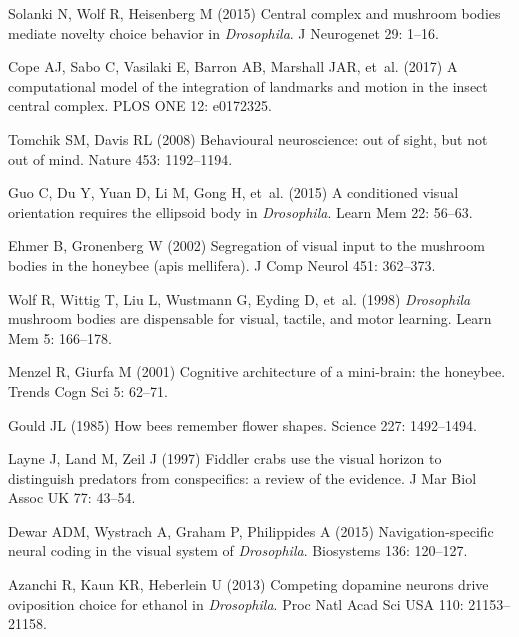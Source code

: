 \begin{thebibliography}{10}
	Solanki N, Wolf R, Heisenberg M (2015) Central complex and mushroom bodies
	mediate novelty choice behavior in \emph{Drosophila}.
	\newblock J Neurogenet 29: 1--16.
	
	Cope AJ, Sabo C, Vasilaki E, Barron AB, Marshall JAR, et~al. (2017) {A
		computational model of the integration of landmarks and motion in the insect
		central complex}.
	\newblock PLOS ONE 12: e0172325.
	
	Tomchik SM, Davis RL (2008) Behavioural neuroscience: out of sight, but not out
	of mind.
	\newblock Nature 453: 1192--1194.
	
	Guo C, Du Y, Yuan D, Li M, Gong H, et~al. (2015) A conditioned visual
	orientation requires the ellipsoid body in \emph{Drosophila}.
	\newblock Learn Mem 22: 56--63.
	
	Ehmer B, Gronenberg W (2002) Segregation of visual input to the mushroom bodies
	in the honeybee (apis mellifera).
	\newblock J Comp Neurol 451: 362--373.
	
	Wolf R, Wittig T, Liu L, Wustmann G, Eyding D, et~al. (1998) \emph{Drosophila}
	mushroom bodies are dispensable for visual, tactile, and motor learning.
	\newblock Learn Mem 5: 166--178.
	
	Menzel R, Giurfa M (2001) Cognitive architecture of a mini-brain: the honeybee.
	\newblock Trends Cogn Sci 5: 62--71.
	
	Gould JL (1985) How bees remember flower shapes.
	\newblock Science 227: 1492--1494.
	
	Layne J, Land M, Zeil J (1997) Fiddler crabs use the visual horizon to
	distinguish predators from conspecifics: a review of the evidence.
	\newblock J Mar Biol Assoc UK 77: 43--54.
	
	Dewar ADM, Wystrach A, Graham P, Philippides A (2015) Navigation-specific
	neural coding in the visual system of \emph{Drosophila}.
	\newblock Biosystems 136: 120--127.
	
	Azanchi R, Kaun KR, Heberlein U (2013) Competing dopamine neurons drive
	oviposition choice for ethanol in \emph{Drosophila}.
	\newblock Proc Natl Acad Sci USA 110: 21153--21158.
	

\end{thebibliography}
